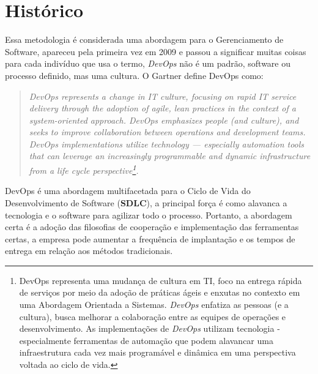 \documentclass[fleqn,10pt]{SelfArx} %
\affiliation{} %
\begin{document}
	
\maketitle %
\thispagestyle{fancy} %

\section*{Histórico}

Essa metodologia é considerada uma abordagem para o Gerenciamento de Software, apareceu pela primeira vez em 2009 e passou a significar muitas coisas para cada indivíduo que usa o termo, \textit{DevOps} não é um padrão, software ou processo definido, mas uma cultura. O Gartner define DevOps como: 
\begin{quotation}
	\textit{DevOps represents a change in IT culture, focusing on rapid IT service delivery through the adoption of agile, lean practices in the context of a system-oriented approach. DevOps emphasizes people (and culture), and seeks to improve collaboration between operations and development teams. DevOps implementations utilize technology — especially automation tools that can leverage an increasingly programmable and dynamic infrastructure from a life cycle perspective\footnote{DevOps representa uma mudança de cultura em TI, foco na entrega rápida de serviços por meio da adoção de práticas ágeis e enxutas no contexto em uma Abordagem Orientada a Sistemas. \textit{DevOps} enfatiza as pessoas (e a cultura), busca melhorar a colaboração entre as equipes de operações e desenvolvimento. As implementações de \textit{DevOps} utilizam tecnologia - especialmente ferramentas de automação que podem alavancar uma infraestrutura cada vez mais programável e dinâmica em uma perspectiva voltada ao ciclo de vida.}.}
\end{quotation}

DevOps é uma abordagem multifacetada para o Ciclo de Vida do Desenvolvimento de Software (\textbf{SDLC}), a principal força é como alavanca a tecnologia e o software para agilizar todo o processo. Portanto, a abordagem certa é a adoção das filosofias de cooperação e implementação das ferramentas certas, a empresa pode aumentar a frequência de implantação e os tempos de entrega em relação aos métodos tradicionais.
\end{document}
